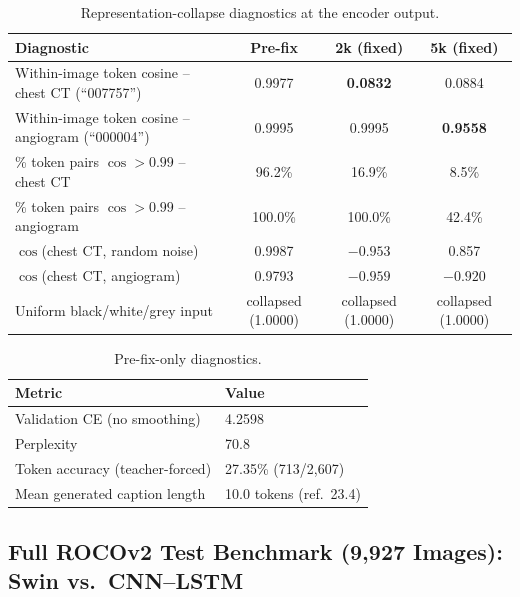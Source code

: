 \documentclass[conference]{IEEEtran}
\begin{document}
\begin{table}[t]
\centering
\caption{Representation-collapse diagnostics at the encoder output.}
\label{tab:representation-collapse}
\small
\renewcommand{\arraystretch}{1.10}
\begin{tabular}{@{}p{}ccc@{}}
\toprule
\textbf{Diagnostic} & \textbf{Pre-fix} & \textbf{2k (fixed)} & \textbf{5k (fixed)} \\
\midrule
Within-image token cosine -- chest CT (``007757'') & 0.9977 & \textbf{0.0832} & 0.0884 \\
Within-image token cosine -- angiogram (``000004'') & 0.9995 & 0.9995 & \textbf{0.9558} \\
\% token pairs $\cos > 0.99$ -- chest CT & 96.2\% & 16.9\% & 8.5\% \\
\% token pairs $\cos > 0.99$ -- angiogram & 100.0\% & 100.0\% & 42.4\% \\
$\cos$(chest CT, random noise) & 0.9987 & $-0.953$ & 0.857 \\
$\cos$(chest CT, angiogram) & 0.9793 & $-0.959$ & $-0.920$ \\
Uniform black/white/grey input & collapsed (1.0000) & collapsed (1.0000) & collapsed (1.0000) \\
\bottomrule
\end{tabular}
\end{table}

\begin{table}[htbp]
\centering
\caption{Pre-fix-only diagnostics.}
\label{tab:prefix-only-diagnostics}
\small
\renewcommand{\arraystretch}{1.12}
\begin{tabular}{@{}p{}p{}@{}}
\toprule
\textbf{Metric} & \textbf{Value} \\
\midrule
Validation CE (no smoothing) & 4.2598 \\
Perplexity & 70.8 \\
Token accuracy (teacher-forced) & 27.35\% (713/2,607) \\
Mean generated caption length & 10.0 tokens (ref.\ 23.4) \\
\bottomrule
\end{tabular}
\end{table}

\subsection{Full ROCOv2 Test Benchmark (9,927 Images): Swin vs.\ CNN--LSTM}
\label{sec:results-full-benchmark}
\end{document}
